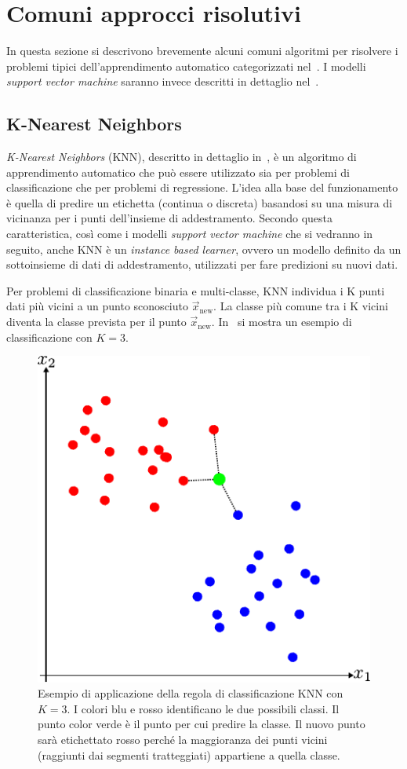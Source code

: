 \section{Comuni approcci risolutivi}\label{sec:comuni_approcci_risolutivi}
In questa sezione si descrivono brevemente alcuni comuni algoritmi per risolvere i problemi tipici dell'apprendimento automatico categorizzati nel~.
I modelli \emph{support vector machine} saranno invece descritti in dettaglio nel~.

\subsection{K-Nearest Neighbors}\label{sec:ml:knn}
\emph{K-Nearest Neighbors} (KNN), descritto in dettaglio in~\cite{KNN}, è un algoritmo di apprendimento automatico che può essere utilizzato sia per problemi di classificazione che  per problemi di regressione. 
L'idea alla base del funzionamento è quella di predire un etichetta (continua o discreta) basandosi su una misura di vicinanza per i punti dell'insieme di addestramento. 
Secondo questa caratteristica, così come i modelli \emph{support vector machine} che si vedranno in seguito, anche KNN è un \emph{instance based learner}, ovvero un modello definito da un sottoinsieme di dati di addestramento, utilizzati per fare predizioni su nuovi dati.

Per problemi di classificazione binaria e multi-classe, KNN individua i K punti dati più vicini a un punto sconosciuto $\Vec{x}_\text{new}$. 
La classe più comune tra i K vicini diventa la classe prevista per il punto $\Vec{x}_\text{new}$. 
In~ si mostra un esempio di classificazione con $K=3$.
\begin{figure}
    \centering
    \includegraphics[width=0.7\linewidth]{img/KNN.pdf}
    \caption{Esempio di applicazione della regola di classificazione KNN con $K=3$. I colori blu e rosso identificano le due possibili classi. Il punto color verde è il punto per cui predire la classe.
    Il nuovo punto sarà etichettato rosso perché la maggioranza dei punti vicini (raggiunti dai segmenti tratteggiati) appartiene a quella classe.}
    \label{fig:knn_example}
\end{figure}

